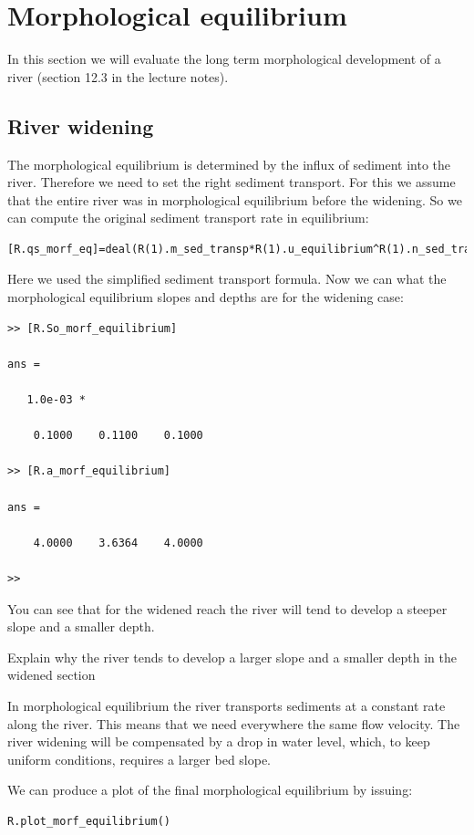 \documentclass[a4paper]{article}
\begin{document}
\section{Morphological equilibrium}
In this section we will evaluate the long term morphological development of a river (section 12.3 in the lecture notes).

\subsection{River widening}
The morphological equilibrium is determined by the influx of sediment into the river. Therefore we need to set the right sediment transport. For this we assume that the entire river was in morphological equilibrium before the widening. So we can compute the original sediment transport rate in equilibrium:
\begin{lstlisting}
[R.qs_morf_eq]=deal(R(1).m_sed_transp*R(1).u_equilibrium^R(1).n_sed_transp);
\end{lstlisting}
Here we used the simplified sediment transport formula. 
Now we can what the morphological equilibrium slopes and depths are for the widening case:
\begin{lstlisting}
>> [R.So_morf_equilibrium]

ans =

   1.0e-03 *

    0.1000    0.1100    0.1000

>> [R.a_morf_equilibrium]

ans =

    4.0000    3.6364    4.0000

>> 
\end{lstlisting}
You can see that for the widened reach the river will tend to develop a steeper slope and a smaller depth.
\begin{exercise}
  Explain why the river tends to develop a larger slope and a smaller depth in the widened section
\end{exercise}
\begin{solution}
In morphological equilibrium the river transports sediments at a constant rate along the river. This means that we need everywhere the same flow velocity. The river widening will be compensated by a drop in water level, which, to keep uniform conditions, requires a larger bed slope.
\end{solution}
We can produce a plot of the final morphological equilibrium by issuing:
\begin{lstlisting}
R.plot_morf_equilibrium()
\end{lstlisting}
\end{document}
